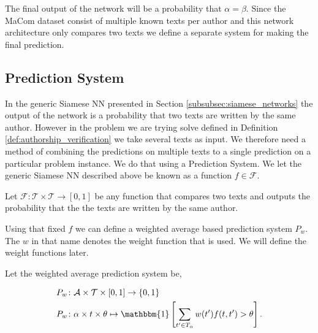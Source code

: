 The final output of the network will be a probability that $\alpha = \beta$.
Since the MaCom dataset consist of multiple known texts per author and this
network architecture only compares two texts we define a separate system for
making the final prediction.


\subsection{Prediction System}\label{subsec:prediction_system}

In the generic Siamese \gls{NN} presented in Section
\ref{subsubsec:siamese_networks} the output of the network is a probability that
two texts are written by the same author. However in the problem we are trying
solve defined in Definition \ref{def:authorship_verification} we take several
texts as input. We therefore need a method of combining the predictions on
multiple texts to a single prediction on a particular problem instance. We do
that using a Prediction System. We let the generic Siamese \gls{NN} described
above be known as a function $f \in \mathcal{F}$.

\begin{definition}
    \label{def:text_comparison_function}

    Let $\mathcal{F} \colon \mathcal{T} \times \mathcal{T} \rightarrow [0, 1]$
    be any function that compares two texts and outputs the probability that the
    the texts are written by the same author.

\end{definition}

Using that fixed $f$ we can define a weighted average based prediction system
$P_w$. The $w$ in that name denotes the weight function that is used. We will
define the weight functions later.

\begin{definition}
    \label{def:weighted_average_prediction_system}

    Let the weighted average prediction system be,

    \begin{align}
        &P_w \colon \mathcal{A} \times \mathcal{T} \times [0, 1] \rightarrow
            \{0, 1\} \\
        &P_w \colon \alpha \times t \times \theta \mapsto \mathbbm{1}\left[
                \sum_{t' \in T_\alpha} w(t') f(t, t') > \theta
            \right].
    \end{align}

\end{definition}

